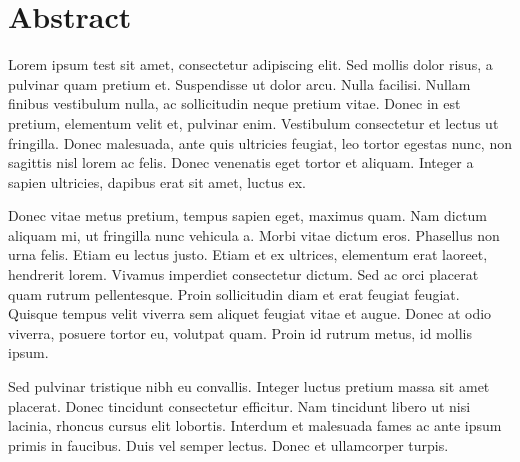 \chapter*{Abstract}

Lorem ipsum \gls{test} sit amet, consectetur adipiscing elit. Sed mollis dolor risus, a pulvinar quam pretium et. Suspendisse ut dolor arcu. Nulla facilisi. Nullam finibus vestibulum nulla, ac sollicitudin neque pretium vitae. Donec in est pretium, elementum velit et, pulvinar enim. Vestibulum consectetur et lectus ut fringilla. Donec malesuada, ante quis ultricies feugiat, leo tortor egestas nunc, non sagittis nisl lorem ac felis. Donec venenatis eget tortor et aliquam. Integer a sapien ultricies, dapibus erat sit amet, luctus ex.

Donec vitae metus pretium, tempus sapien eget, maximus quam. Nam dictum aliquam mi, ut fringilla nunc vehicula a. Morbi vitae dictum eros. Phasellus non urna felis. Etiam eu lectus justo. Etiam et ex ultrices, elementum erat laoreet, hendrerit lorem. Vivamus imperdiet consectetur dictum. Sed ac orci placerat quam rutrum pellentesque. Proin sollicitudin diam et erat feugiat feugiat. Quisque tempus velit viverra sem aliquet feugiat vitae et augue. Donec at odio viverra, posuere tortor eu, volutpat quam. Proin id rutrum metus, id mollis ipsum.

Sed pulvinar tristique nibh eu convallis. Integer luctus pretium massa sit amet placerat. Donec tincidunt consectetur efficitur. Nam tincidunt libero ut nisi lacinia, rhoncus cursus elit lobortis. Interdum et malesuada fames ac ante ipsum primis in faucibus. Duis vel semper lectus. Donec et ullamcorper turpis.